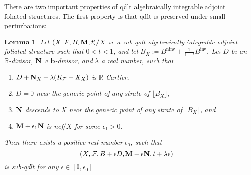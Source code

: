 \documentclass[12pt]{amsart}
\numberwithin{equation}{section}
\newcommand{\bb}{\bm{b}}
\newcommand{\Mm}{{\bf{M}}}
\newcommand{\Nn}{{\bf{N}}}
\newcommand{\Rr}{\mathbb{R}}
\newcommand{\ninv}{\operatorname{ninv}}
\newcommand{\inv}{\operatorname{inv}}
\newcommand{\Ff}{\mathcal{F}}
\newtheorem{lem}[thm]{Lemma}
\theoremstyle{definition}
\theoremstyle{definition}
\theoremstyle{definition}
\begin{document}
There are two important properties of qdlt algebraically integrable adjoint foliated structures. The first property is that qdlt is preserved under small perturbations:


\begin{lem}\label{lem: perturb qdlt afs}
Let $(X,\Ff,B,\Mm,t)/X$ be a sub-qdlt algebraically integrable adjoint foliated structure such that $0<t<1$,
and let $B_X:=B^{\ninv}+\frac{1}{1-t}B^{\inv}$. Let $D$ be an $\Rr$-divisor, $\Nn$ a $\bb$-divisor, and $\lambda$ a real number, such that 
\begin{enumerate}
    \item $D+\Nn_X+\lambda(K_{\Ff}-K_X)$ is $\Rr$-Cartier, 
    \item $D=0$ near the generic point of any strata of $\lfloor B_X\rfloor$, 
    \item $\Nn$ descends to $X$  near the generic point of any strata of $\lfloor B_X\rfloor$, and
    \item $\Mm+\epsilon_1\Nn$ is nef$/X$ for some $\epsilon_1>0$.
\end{enumerate}
Then there exists a positive real number $\epsilon_0$, such that
$$(X,\Ff,B+\epsilon D,\Mm+\epsilon\Nn,t+\lambda\epsilon)$$
is sub-qdlt for any $\epsilon\in [0,\epsilon_0]$.
\end{lem}
\end{document}
